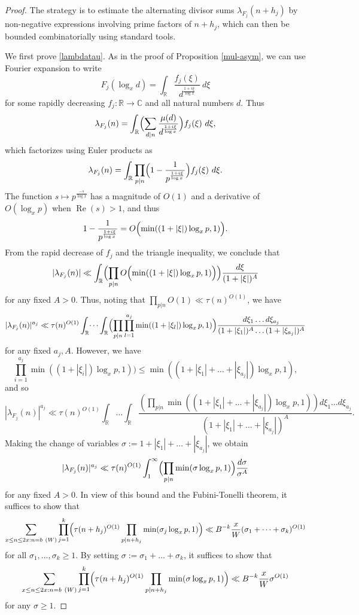 \documentclass{bmcart}
\theoremstyle{plain}
\theoremstyle{definition}
\newcommand\R{\mathbb{R}}
\newcommand\C{\mathbb{C}}
\renewcommand\Re{\operatorname{Re}}
\begin{document}
\begin{proof}  The strategy is to estimate the alternating divisor sums $\lambda_{F_j}(n+h_j)$ by non-negative expressions involving prime factors of $n+h_j$, which can then be bounded combinatorially using standard tools.

We first prove \eqref{lambdatau}.
As in the proof of Proposition \ref{mul-asym}, we can use Fourier expansion to write
$$ F_j( \log_x d ) = \int_\R \frac{f_j(\xi)}{d^{\frac{1+i\xi}{\log x}}}\ d\xi$$
for some rapidly decreasing $f_j: \R \to \C$ and all natural numbers $d$.  Thus
$$ \lambda_{F_j}(n) = \int_\R \Bigl(\sum_{d|n} \frac{\mu(d)}{d^{\frac{1+i\xi}{\log x}}}\Bigr) f_j(\xi)\ d\xi, $$
which factorizes using Euler products as
$$ \lambda_{F_j}(n) = \int_\R \prod_{p|n} \Bigl(1 - \frac{1}{p^{\frac{1+i\xi}{\log x}}}\Bigr) f_j(\xi)\ d\xi.$$
The function $s \mapsto p^{\frac{-s}{\log x}}$ has a magnitude of $O(1)$ and a derivative of $O( \log_x p )$ when $\Re(s) > 1$, and thus
$$ 1 - \frac{1}{p^{\frac{1+i\xi}{\log x}}} = O\Bigl( \min( (1+|\xi|) \log_x p, 1) \Bigr).$$
From the rapid decrease of $f_j$ and the triangle inequality, we conclude that
$$ |\lambda_{F_j}(n)| \ll \int_\R \Bigl(\prod_{p|n} O\Bigl( \min( (1+|\xi|) \log_x p, 1)\Bigr)\Bigr) \frac{d\xi}{(1+|\xi|)^A}$$
for any fixed $A > 0$. Thus, noting that $\prod_{p|n}O(1)\ll \tau(n)^{O(1)}$, we have
$$ |\lambda_{F_j}(n)|^{a_j} \ll \tau(n)^{O(1)}\int_\R \dots \int_\R \Bigl(\prod_{p|n}  \prod_{l=1}^{a_j} \min( (1+|\xi_l|) \log_x p, 1)\Bigr) \frac{d\xi_1 \dots d\xi_{a_j}}{(1+|\xi_1|)^A \dots (1+|\xi_{a_j}|)^A}
$$
for any fixed $a_j,A$. However, we have
$$ \prod_{i=1}^{a_j}\min( (1+|\xi_i|) \log_x p, 1)) \leq \min( (1+|\xi_1|+\dots+|\xi_{a_j}|) \log_x p, 1 ), $$
and so
$$ |\lambda_{F_j}(n)|^{a_j} \ll \tau(n)^{O(1)}\int_\R \dots \int_\R \frac{(\prod_{p|n} \min( (1+|\xi_1|+\dots+|\xi_{a_j}|) \log_x p, 1)) d\xi_1 \dots d \xi_{a_j}}{(1+|\xi_1|+\dots+|\xi_{a_j}|)^A}.$$
Making the change of variables $\sigma := 1+|\xi_1|+\dots+|\xi_{a_j}|$, we obtain
$$ |\lambda_{F_j}(n)|^{a_j} \ll \tau(n)^{O(1)} \int_1^\infty \Bigl(\prod_{p|n} \min(\sigma \log_x p, 1)\Bigr) \frac{d\sigma}{\sigma^A}$$
for any fixed $A>0$.  In view of this bound and the Fubini-Tonelli theorem, it suffices to show that
$$
\sum_{x \leq n \leq 2x: n = b\ (W)} \prod_{j=1}^k \Bigl(\tau(n+h_j)^{O(1)} \prod_{p|n+h_j} \min(\sigma_j \log_x p,1)\Bigr) \ll B^{-k} \frac{x}{W} (\sigma_1+\dots+\sigma_k)^{O(1)}$$
for all $\sigma_1,\dots,\sigma_k \geq 1$. By setting $\sigma := \sigma_1+\dots+\sigma_k$, it suffices to show that
\begin{equation}\label{xnx}
\sum_{x \leq n \leq 2x: n = b\ (W)} \prod_{j=1}^k \Bigl(\tau(n+h_j)^{O(1)} \prod_{p|n+h_j} \min(\sigma \log_x p,1)\Bigr) \ll B^{-k} \frac{x}{W} \sigma^{O(1)}
\end{equation}
for any $\sigma \geq 1$.


\end{proof}
\end{document}
